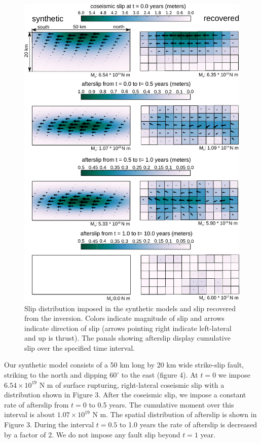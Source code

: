 \documentclass[extra,mreferee]{gji}
\begin{document}
\begin{figure}\label{figure3}
  \centering
  \includegraphics[scale=0.6]{FinalFigures/Figure2.pdf}
  \caption{Slip distribution imposed in the synthetic models and slip
    recovered from the inversion. Colors indicate magnitude of slip
    and arrows indicate direction of slip (arrows pointing right
    indicate left-lateral and up is thrust).  The panals showing
    afterslip display cumulative slip over the specified time
    interval.}
  \label{Figure 3}
\end{figure}

Our synthetic model consists of a 50 km long by 20 km wide strike-slip
fault, striking to the north and dipping $60^{\circ}$ to the east (figure
4). At $t=0$ we impose $6.54\times 10^{19}$ N m of surface rupturing,
right-lateral coseismic slip with a distribution shown in Figure 3.
After the coseismic slip, we impose a constant rate of afterslip from
$t=0$ to 0.5 years.  The cumulative moment over this
interval is about $1.07\times 10^{19}$ N m.  The spatial distribution of
afterslip is shown in Figure 3.  During the interval $t=0.5$ to
1.0 years the rate of afterslip is decreased by a factor of 2.
We do not impose any fault slip beyond $t=1$ year.
\end{document}
